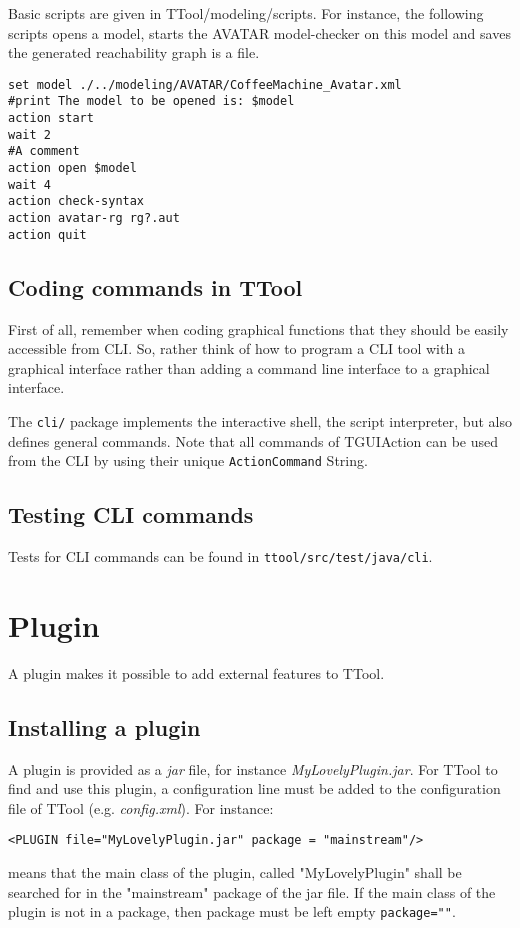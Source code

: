 \documentclass[12pt]{article}
\begin{document}
Basic scripts are given in TTool/modeling/scripts. For instance, the following scripts opens a model, starts the AVATAR model-checker on this model and saves the generated reachability graph is a file.

\begin{lstlisting}
set model ./../modeling/AVATAR/CoffeeMachine_Avatar.xml
#print The model to be opened is: $model
action start
wait 2
#A comment
action open $model
wait 4
action check-syntax
action avatar-rg rg?.aut
action quit
\end{lstlisting}


\subsection{Coding commands in TTool}
First of all, remember when coding graphical functions that they should be easily accessible from CLI. So, rather think of how to program a CLI tool with a graphical interface rather than adding a command line interface to a graphical interface.

The  \texttt{cli/} package implements the interactive shell, the script interpreter, but also defines general commands. Note that all commands of TGUIAction can be used from the CLI by using their unique \texttt{ActionCommand} String.

\subsection{Testing CLI commands}
Tests for CLI commands can be found in \texttt{ttool/src/test/java/cli}.

\newpage
\section{Plugin}

A plugin makes it possible to add external features to TTool. 

\subsection{Installing a plugin}
A plugin is provided as a \textit{jar} file, for instance \textit{MyLovelyPlugin.jar}. For TTool to find and use this plugin, a configuration line must be added to the configuration file of TTool (e.g. \textit{config.xml}). For instance:

\begin{lstlisting}
<PLUGIN file="MyLovelyPlugin.jar" package = "mainstream"/>
\end{lstlisting}
means that the main class of the plugin, called "MyLovelyPlugin" shall be searched for in the "mainstream" package of the jar file. If the main class of the plugin is not in a package, then package must be left empty  \texttt{package=""}.
\end{document}
